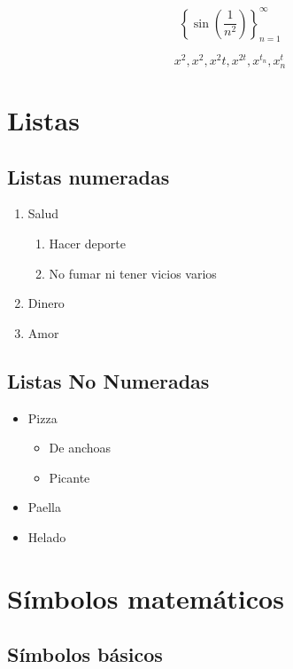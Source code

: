 \documentclass{article}
\begin{document}
$$\left\{\sin\left(\frac{1}{n^2}\right)\right\}_{n=1}^\infty$$

$$x^2, x^{2}, x^2t, x^{2t}, x^{t_n}, x^t_n$$


\section{Listas}

\subsection{Listas numeradas}
\begin{enumerate}
    \item Salud
    \begin{enumerate}
        \item Hacer deporte
        \item No fumar ni tener vicios varios
    \end{enumerate}
    \item Dinero
    \item Amor
\end{enumerate}

\subsection{Listas No Numeradas}
\begin{itemize}
    \item Pizza
    \begin{itemize}
        \item De anchoas
        \item Picante
    \end{itemize}
    \item Paella
    \item Helado
\end{itemize}


\section{Símbolos matemáticos}
\subsection{Símbolos básicos}
\end{document}
